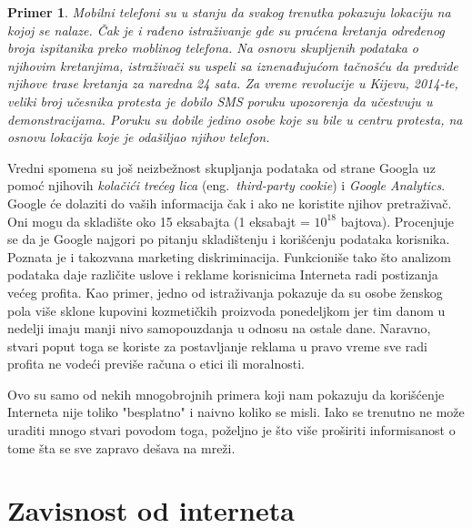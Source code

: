 \documentclass[a4paper]{article}
\newtheorem{primer}{Primer}[section]
\begin{document}
\begin{primer}
	Mobilni telefoni su u stanju da svakog trenutka pokazuju lokaciju na kojoj se nalaze. Čak je i rađeno istraživanje gde su praćena kretanja određenog broja ispitanika preko moblinog telefona. Na osnovu skupljenih podataka o njihovim kretanjima, istraživači su uspeli sa iznenađujućom tačnošću da predvide njihove trase kretanja za naredna 24 sata. Za vreme revolucije u Kijevu, 2014-te, veliki broj učesnika protesta je dobilo SMS poruku upozorenja da učestvuju u demonstracijama. Poruku su dobile jedino osobe koje su bile u centru protesta, na osnovu lokacija koje je odašiljao njihov telefon. \cite{dataAndGoliath}
\end{primer}

	Vredni spomena su još neizbežnost skupljanja podataka od strane Googla uz pomoć njihovih {\em kolačići trećeg lica} (eng.~{\em third-party cookie}) i \textit{Google Analytics}. Google će dolaziti do vaših informacija čak i ako ne koristite njihov pretraživač. Oni mogu da skladište oko 15 eksabajta (1 eksabajt = $10^{18}$ bajtova). Procenjuje se da je Google najgori po pitanju skladištenju i korišćenju podataka korisnika. Poznata je i takozvana marketing diskriminacija. Funkcioniše tako što analizom podataka daje različite uslove i reklame korisnicima Interneta radi postizanja većeg profita. Kao primer, jedno od istraživanja pokazuje da su osobe ženskog pola više sklone kupovini kozmetičkih proizvoda ponedeljkom jer tim danom u nedelji imaju manji nivo samopouzdanja u odnosu na ostale dane. Naravno, stvari poput toga se koriste za postavljanje reklama u pravo vreme sve radi profita ne vodeći previše računa o etici ili moralnosti. \cite{dataAndGoliath} \cite{theNetDelusion}

	Ovo su samo od nekih mnogobrojnih primera koji nam pokazuju da korišćenje Interneta nije toliko "besplatno" i naivno koliko se misli. Iako se trenutno ne može uraditi mnogo stvari povodom toga, poželjno je što više proširiti informisanost o tome šta se sve zapravo dešava na mreži.

\section{Zavisnost od interneta}
\end{document}
